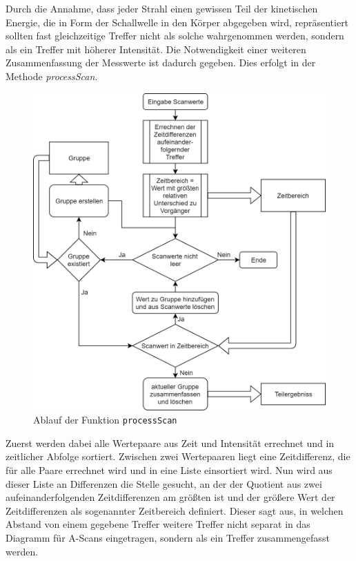 \documentclass[reducespace,stylepage,semiarbeit]{spezidoc}
\begin{document}
Durch die Annahme, dass jeder Strahl einen gewissen Teil der kinetischen Energie, die in Form der Schallwelle in den Körper abgegeben wird, repräsentiert sollten fast gleichzeitige Treffer nicht als solche wahrgenommen werden, sondern als ein Treffer mit höherer Intensität. %
Die Notwendigkeit einer weiteren Zusammenfassung der Messwerte ist dadurch gegeben. 
Dies erfolgt in der Methode \textsl{processScan}. \par %
\begin{figure}
\includegraphics[scale=0.3]{pictures/Flowchart_processScan.png}
\caption{Ablauf der Funktion \texttt{processScan}}
\end{figure} 
Zuerst werden dabei alle Wertepaare aus Zeit und Intensität errechnet und in zeitlicher Abfolge sortiert. 
Zwischen zwei Wertepaaren liegt eine Zeitdifferenz, die für alle Paare errechnet wird und in eine Liste einsortiert wird.
Nun wird aus dieser Liste an Differenzen die Stelle gesucht, an der der Quotient aus zwei aufeinanderfolgenden Zeitdifferenzen am größten ist und der größere Wert der Zeitdifferenzen als sogenannter Zeitbereich definiert. 
Dieser sagt aus, in welchen Abstand von einem gegebene Treffer weitere Treffer nicht separat in das Diagramm für A-Scans eingetragen, sondern als ein Treffer zusammengefasst werden.\\
\end{document}
